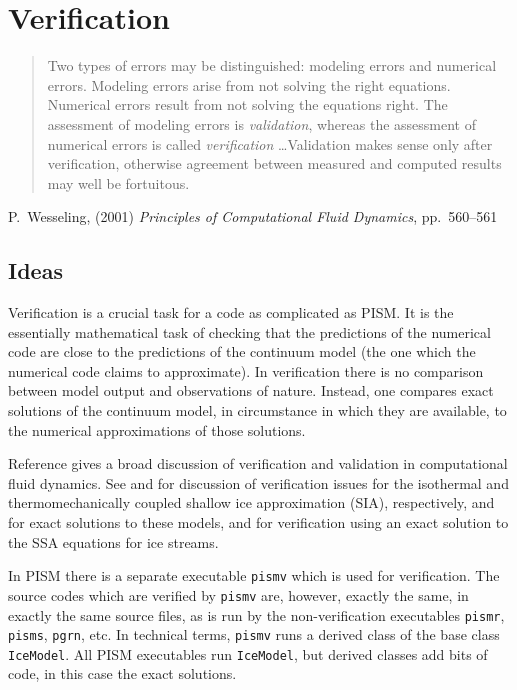 
\section{Verification}\label{sect:verif}

\bigskip
\begin{quote}  Two types of errors may be distinguished: modeling errors and numerical errors.  Modeling errors arise from not solving the right equations.  Numerical errors result from not solving the equations right.  The assessment of modeling errors is \emph{validation}, whereas the assessment of numerical errors is called \emph{verification} \dots  Validation makes sense only after verification, otherwise agreement between measured and computed results may well be fortuitous.
\end{quote}
\hfill P.~Wesseling, (2001)  \emph{Principles of Computational Fluid Dynamics}, pp.~560--561 \cite{Wesseling}
\bigskip

\subsection{Ideas}  Verification is a crucial task for a code as complicated as PISM.  It is the essentially mathematical task of checking that the predictions of the numerical code are close to the predictions of the continuum model (the one which the numerical code claims to approximate).  In verification there is no comparison between model output and observations of nature.  Instead, one compares exact solutions of the continuum model, in circumstance in which they are available, to the numerical approximations of those solutions.

Reference \cite{Roache} gives a broad discussion of verification and validation in computational fluid dynamics. See \cite{BLKCB} and \cite{BBL} for discussion of verification issues for the isothermal and thermomechanically coupled shallow ice approximation (SIA), respectively, and for exact solutions to these models, and \cite{BBssasliding,SchoofStream} for verification using an exact solution to the SSA equations for ice streams.  

In PISM there is a separate executable \verb|pismv| which is used for verification.  The source codes which are verified by \verb|pismv| are, however, exactly the same, in exactly the same source files, as is run by the non-verification executables \verb|pismr|, \verb|pisms|, \verb|pgrn|, etc.  In technical terms, \verb|pismv| runs a derived class of the base class \verb|IceModel|.  All PISM executables run \verb|IceModel|, but derived classes add bits of code, in this case the exact solutions.

